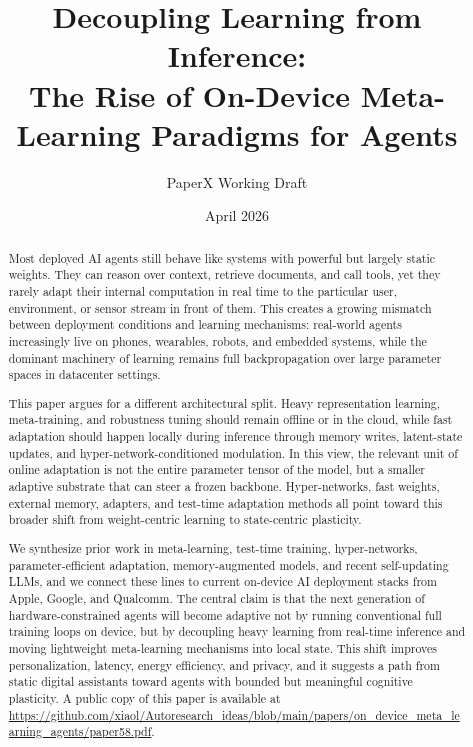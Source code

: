 \documentclass[11pt,a4paper]{article}
\title{Decoupling Learning from Inference:\\\Large The Rise of On-Device Meta-Learning Paradigms for Agents}
\author{PaperX Working Draft}
\date{April 2026}
\begin{document}
\maketitle

\begin{abstract}
Most deployed AI agents still behave like systems with powerful but largely static weights. They can reason over context, retrieve documents, and call tools, yet they rarely adapt their internal computation in real time to the particular user, environment, or sensor stream in front of them. This creates a growing mismatch between deployment conditions and learning mechanisms: real-world agents increasingly live on phones, wearables, robots, and embedded systems, while the dominant machinery of learning remains full backpropagation over large parameter spaces in datacenter settings.

This paper argues for a different architectural split. Heavy representation learning, meta-training, and robustness tuning should remain offline or in the cloud, while fast adaptation should happen locally during inference through memory writes, latent-state updates, and hyper-network-conditioned modulation. In this view, the relevant unit of online adaptation is not the entire parameter tensor of the model, but a smaller adaptive substrate that can steer a frozen backbone. Hyper-networks, fast weights, external memory, adapters, and test-time adaptation methods all point toward this broader shift from weight-centric learning to state-centric plasticity.

We synthesize prior work in meta-learning, test-time training, hyper-networks, parameter-efficient adaptation, memory-augmented models, and recent self-updating LLMs, and we connect these lines to current on-device AI deployment stacks from Apple, Google, and Qualcomm. The central claim is that the next generation of hardware-constrained agents will become adaptive not by running conventional full training loops on device, but by decoupling heavy learning from real-time inference and moving lightweight meta-learning mechanisms into local state. This shift improves personalization, latency, energy efficiency, and privacy, and it suggests a path from static digital assistants toward agents with bounded but meaningful cognitive plasticity. A public copy of this paper is available at \url{https://github.com/xiaol/Autoresearch_ideas/blob/main/papers/on_device_meta_learning_agents/paper58.pdf}.
\end{abstract}
\end{document}

